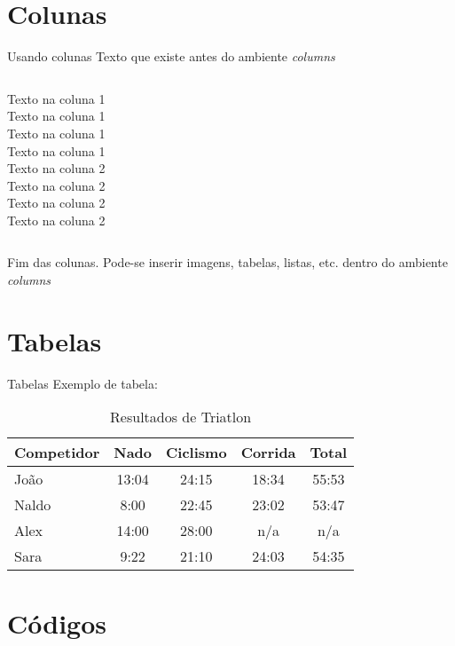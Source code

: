 \documentclass[red]{beamer}
\begin{document}
		\section{Colunas}
			\begin{frame}{Usando colunas}
				Texto que existe antes do ambiente \textit{columns}
				
				\vspace*{5mm}
				
				\begin{columns}
					Texto na coluna 1\\
					Texto na coluna 1\\
					Texto na coluna 1\\
					Texto na coluna 1\\
					
					Texto na coluna 2\\
					Texto na coluna 2\\
					Texto na coluna 2\\
					Texto na coluna 2
				\end{columns}
				
				\vspace*{5mm}
				
				Fim das colunas. Pode-se inserir imagens, tabelas, listas, etc. dentro do ambiente \textit{columns}
			\end{frame}
		
		\section{Tabelas}
			\begin{frame}{Tabelas}
				Exemplo de tabela:
				\begin{table}
					\begin{tabular}{l | c | c | c | c }
						Competidor & Nado & Ciclismo & Corrida & Total \\
						\hline \hline
						João & 13:04 & 24:15 & 18:34 & 55:53 \\ 
						Naldo & 8:00 & 22:45 & 23:02 & 53:47\\
						Alex & 14:00 & 28:00 & n/a & n/a\\
						Sara & 9:22 & 21:10 & 24:03 & 54:35 
					\end{tabular}
					\caption{Resultados de Triatlon}
				\end{table}
			\end{frame}
			
		\section{Códigos}
\end{document}
